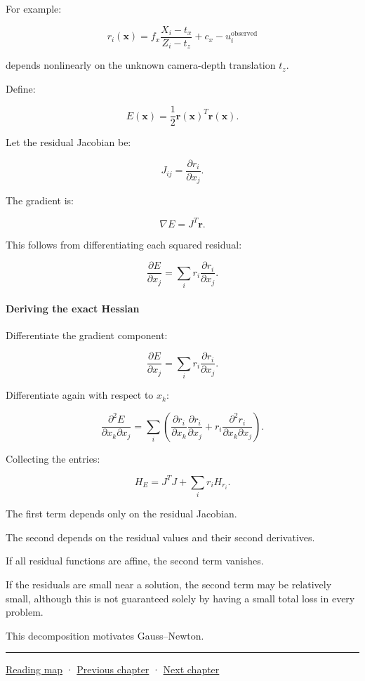 For example:

\[
r_i(\mathbf x) = f_x\frac{X_i-t_x}{Z_i-t_z}+c_x-u_i^{\mathrm{observed}}
\]

depends nonlinearly on the unknown camera-depth translation \(t_z\).

Define:

\[
E(\mathbf x)=\frac12\mathbf r(\mathbf x)^T\mathbf r(\mathbf x).
\]

Let the residual Jacobian be:

\[
J_{ij}= \frac{\partial r_i}{\partial x_j}.
\]

The gradient is:

\[
\boxed{ \nabla E=J^T\mathbf r }.
\]

This follows from differentiating each squared residual:

\[
\frac{\partial E}{\partial x_j} = \sum_i r_i\frac{\partial r_i}{\partial x_j}.
\]

\paragraph{Deriving the exact Hessian}\label{02-foundations-ii-ch026-deriving-the-exact-hessian}

\hypertarget{02-foundations-ii-ch026-deriving-the-exact-hessian}{}

Differentiate the gradient component:

\[
\frac{\partial E}{\partial x_j} = \sum_i r_i\frac{\partial r_i}{\partial x_j}.
\]

Differentiate again with respect to \(x_k\):

\[
\frac{\partial^2E}{\partial x_k\partial x_j} = \sum_i \left( \frac{\partial r_i}{\partial x_k} \frac{\partial r_i}{\partial x_j} + r_i\frac{\partial^2r_i}{\partial x_k\partial x_j} \right).
\]

Collecting the entries:

\[
\boxed{ H_E = J^TJ+ \sum_i r_iH_{r_i} }.
\]

The first term depends only on the residual Jacobian.

The second depends on the residual values and their second derivatives.

If all residual functions are affine, the second term vanishes.

If the residuals are small near a solution, the second term may be relatively small, although this is not guaranteed solely by having a small total loss in every problem.

This decomposition motivates Gauss--Newton.

\begin{center}\rule{0.5\linewidth}{0.5pt}\end{center}

\hyperref[volume-reading-map]{Reading map} · \hyperref[02-foundations-ii-ch025-continuous-models-and-numerical-error]{Previous chapter} · \hyperref[02-foundations-ii-ch027-gaussnewton-for-geometry-and-pose]{Next chapter}
